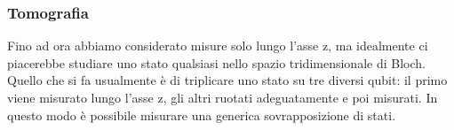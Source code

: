 \subsubsection{Tomografia}
Fino ad ora abbiamo considerato misure solo lungo l'asse z, ma idealmente ci piacerebbe studiare uno stato qualsiasi nello spazio tridimensionale di Bloch.
Quello che si fa usualmente è di triplicare uno stato su tre diversi qubit: il primo viene misurato lungo l'asse z, gli altri ruotati adeguatamente e poi misurati. In questo modo è possibile misurare una generica sovrapposizione di stati.